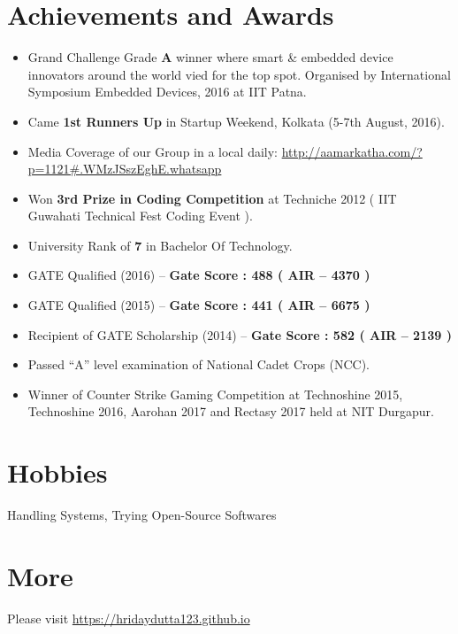 \documentclass[margin, centered]{res}
\begin{document}
\begin{resume}
\section{Achievements and Awards}
\begin{itemize}[leftmargin=*]
 \item Grand Challenge Grade \textbf{A} winner where smart \& embedded device innovators around the world vied for the top spot. Organised by International Symposium Embedded Devices, 2016 at IIT Patna.
 \item Came \textbf{1st Runners Up} in Startup Weekend, Kolkata (5-7th August, 2016).
 \item Media Coverage of our Group in a local daily: \url{http://aamarkatha.com/?p=1121#.WMzJSszEghE.whatsapp}
 \item Won \textbf{3rd Prize in Coding Competition} at Techniche 2012 ( IIT Guwahati Technical Fest Coding Event ).
 \item University Rank of \textbf{7} in Bachelor Of Technology.
 \item GATE Qualified (2016) – \textbf{Gate Score : 488 ( AIR – 4370 ) }
 \item GATE Qualified (2015) – \textbf{Gate Score : 441 ( AIR – 6675 ) }
 \item Recipient of GATE Scholarship (2014) – \textbf{Gate Score : 582 ( AIR – 2139 ) }
 \item Passed “A” level examination of National Cadet Crops (NCC).
 \item Winner of Counter Strike Gaming Competition at Technoshine 2015, Technoshine 2016, Aarohan 2017 and Rectasy 2017 held at NIT Durgapur.
\end{itemize}


\section{Hobbies}
Handling Systems, Trying Open-Source Softwares

\section{More}
Please visit \href{https://hridaydutta123.github.io}{https://hridaydutta123.github.io}

\end{resume}
\end{document}
